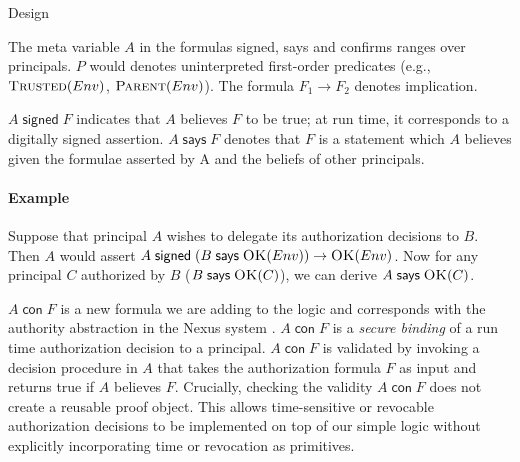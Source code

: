 \documentclass[10pt]{article}
\newcommand{\sign}[2]{\ensuremath{#1\;\textsf{signed}\;#2}}
\newcommand{\imp}[2]{\ensuremath{#1 \rightarrow #2}}
\newcommand{\says}[2]{\ensuremath{#1\;\textsf{says}\;#2}}
\newcommand{\confirms}[2]{\ensuremath{#1\;\textsf{con}\;#2}}
\newcommand{\pred}[2]{\ensuremath{\textsc{#1}(#2)}}
\begin{document}
\begin{section}{Design}
\medskip

The meta variable $A$ in the formulas \textsf{signed}, \textsf{says} and \textsf{confirms} ranges over principals.
$P$ would denotes uninterpreted first-order predicates (e.g., \pred{Trusted}{Env}, \pred{Parent}{Env}).
The formula \imp{F_1}{F_2} denotes implication. 

\sign{A}{F} indicates that $A$ believes $F$ to be true; at run time, it corresponds to a digitally signed assertion.
\says{A}{F} denotes that $F$ is a statement which $A$ believes given the formulae asserted by A and the beliefs of other principals.

\paragraph{Example} Suppose that principal $A$ wishes to delegate its authorization decisions to $B$. Then $A$ would assert \sign{A}{\imp{(\says{B}{\pred{OK}{Env}})}{\pred{OK}{Env}}}. Now for any principal $C$ authorized by $B$ (\says{B}{\pred{OK}{C}}), we can derive \says{A}{\pred{OK}{C}}.

\medskip

\confirms{A}{F} is a new formula we are adding to the logic and corresponds with the authority abstraction in the Nexus system \cite{Nexus}. 
\confirms{A}{F} is a \emph{secure binding} of a run time authorization decision to a principal. \confirms{A}{F} is validated by invoking a decision procedure in $A$ that takes the authorization formula $F$ as input and returns true if $A$ believes $F$.
Crucially, checking the validity $\confirms{A}{F}$ does not create a reusable proof object.
This allows time-sensitive or revocable authorization decisions to be implemented on top of our simple logic without explicitly incorporating time or revocation as primitives.
\end{section}
\end{document}
